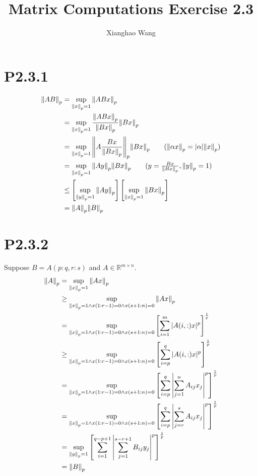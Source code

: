 \documentclass{article}
\author{Xianghao Wang}
\title{Matrix Computations Exercise 2.3}
\begin{document}
\maketitle

\section*{P2.3.1}
\begin{align*}
    \norm{AB}_p
     & = \sup_{\norm{x}_p=1} \norm{ABx}_p                                                                                 \\
     & = \sup_{\norm{x}_p=1} \frac{\norm{ABx}_p}{\norm{Bx}_p} \norm{Bx}_p                                                 \\
     & = \sup_{\norm{x}_p=1} \norm{A\frac{Bx}{\norm{Bx}_p}}_p \norm{Bx}_p \tag*{($\norm{\alpha x}_p=|\alpha|\norm{x}_p$)} \\
     & = \sup_{\norm{x}_p=1} \norm{Ay}_p \norm{Bx}_p \tag*{($y=\frac{Bx}{\norm{Bx}_p},\norm{y}_p=1$)}                     \\
     & \le \left[\sup_{\norm{y}_p=1} \norm{Ay}_p \right] \left[ \sup_{\norm{x}_p=1}\norm{Bx}_p\right]                     \\
     & = \norm{A}_p\norm{B}_p
\end{align*}

\section*{P2.3.2}
Suppose $B=A(p:q,r:s)$ and $A\in\mathbb{R}^{m\times n}$.
\begin{align*}
    \norm{A}_p
     & =\sup_{\norm{x}_p=1} \norm{Ax}_p                                                                                                      \\
     & \ge \sup_{\norm{x}_p=1 \land x(1:r-1)=0 \land x(s+1:n)=0 } \norm{Ax}_p                                                                \\
     & = \sup_{\norm{x}_p=1 \land x(1:r-1)=0 \land x(s+1:n)=0 } \left[\sum_{i=1}^m |A(i,:)x|^p \right]^\frac{1}{p}                           \\
     & \ge \sup_{\norm{x}_p=1 \land x(1:r-1)=0 \land x(s+1:n)=0 } \left[\sum_{i=p}^q |A(i,:)x|^p \right]^\frac{1}{p}                         \\
     & = \sup_{\norm{x}_p=1 \land x(1:r-1)=0 \land x(s+1:n)=0 } \left[\sum_{i=p}^q \left|\sum_{j=1}^n A_{ij}x_j\right|^p \right]^\frac{1}{p} \\
     & = \sup_{\norm{x}_p=1 \land x(1:r-1)=0 \land x(s+1:n)=0 } \left[\sum_{i=p}^q \left|\sum_{j=r}^s A_{ij}x_j\right|^p \right]^\frac{1}{p} \\
     & = \sup_{\norm{y}_p=1} \left[\sum_{i=1}^{q-p+1} \left|\sum_{j=1}^{s-r+1} B_{ij}y_j\right|^p \right]^\frac{1}{p}                        \\
     & = \norm{B}_p
\end{align*}
\end{document}
